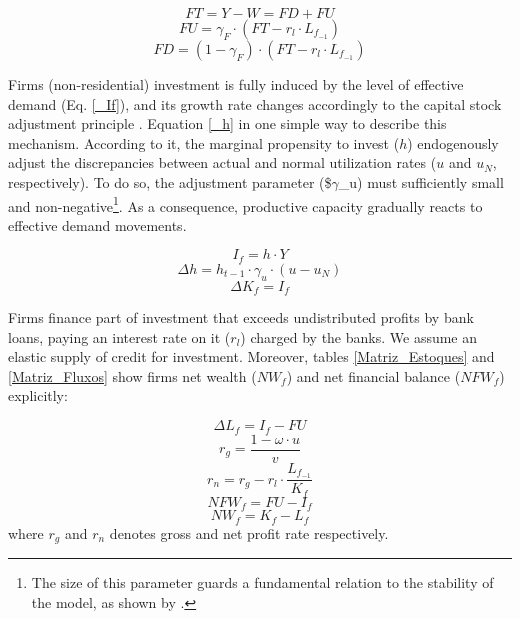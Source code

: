 \documentclass[11pt]{article}
\begin{document}
\begin{equation}
\label{_FT}
    FT = Y - W = FD + FU
\end{equation}
\begin{equation}
    FU = \gamma_F\cdot (FT - r_l\cdot L_{f_{-1}})
\end{equation}
\begin{equation}
    FD = (1-\gamma_F)\cdot (FT - r_l\cdot L_{f_{-1}})
\end{equation}

Firms (non-residential) investment is fully induced by the level of effective demand (Eq. \ref{_If}), and its growth rate changes accordingly to the capital stock adjustment principle \cite{freitas_growth_2015}.
Equation \ref{_h} in one simple way to describe this mechanism.
According to it, the marginal propensity to invest (\(h\)) endogenously adjust the discrepancies between actual and normal utilization rates (\(u\) and \(u_N\), respectively). To do so, the adjustment parameter (\$\(\gamma\)\_u) must sufficiently small and non-negative\footnote{The size of this parameter guards a fundamental relation to the stability of the model, as shown by \textcite{freitas_growth_2015}.}. 
As a consequence, productive capacity gradually reacts to effective demand movements.

\begin{equation}
\label{_If}
    I_f = h\cdot Y
\end{equation}
\begin{equation}
\label{_h}
    \Delta h = h_{t-1}\cdot \gamma_u\cdot (u - u_N)
\end{equation}
\begin{equation}
    \Delta K_f = I_f
\end{equation}


Firms finance part of investment that exceeds undistributed profits by bank loans, paying an interest rate on it (\(r_l\)) charged by the banks. 
We assume an elastic supply of credit for investment. 
Moreover, tables \ref{Matriz_Estoques} and \ref{Matriz_Fluxos} show firms net wealth (\(NW_f\)) and net financial balance (\(NFW_f\)) explicitly:

\begin{equation}
\label{_Lf}
    \Delta L_f = I_f - FU
\end{equation}
$$
r_g = \frac{1-\omega\cdot u}{v}
$$
$$
r_n = r_g - r_l\cdot\frac{L_{f_{-1}}}{K_f}
$$
\begin{equation}
    NFW_f = FU - I_f
\end{equation}
\begin{equation}
    NW_f = K_f - L_f
\end{equation}
where \(r_g\) and \(r_n\) denotes gross and net profit rate respectively.
\end{document}
